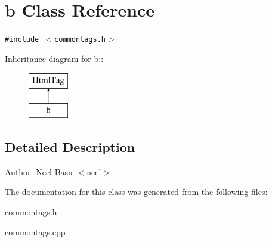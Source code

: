 \section{b Class Reference}
\label{classb}
{\tt \#include $<$commontags.h$>$}

Inheritance diagram for b::\begin{figure}[H]
\begin{center}
\leavevmode
\includegraphics[height=2cm]{classb}
\end{center}
\end{figure}


\subsection{Detailed Description}
\begin{Desc}
\item[Author:]Neel Basu $<$neel$>$ \end{Desc}


The documentation for this class was generated from the following files:\begin{CompactItemize}
\item 
commontags.h\item 
commontags.cpp\end{CompactItemize}
